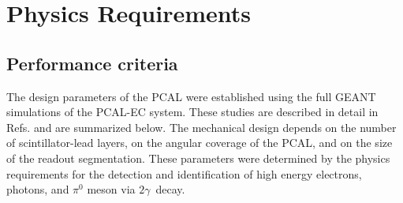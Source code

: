 \section{Physics Requirements}

\subsection{Performance criteria}
The design parameters of the PCAL were established using the full GEANT simulations of the PCAL-EC system. These studies are described in detail in Refs. \cite{2007001} and are summarized below. The mechanical design depends on the number of scintillator-lead layers, on the angular coverage of the PCAL, and on the size of the readout segmentation. These parameters were determined by the physics requirements for the detection and identification of high energy electrons, photons, and $\pi^{0}$ meson via $2\gamma$\ decay.

